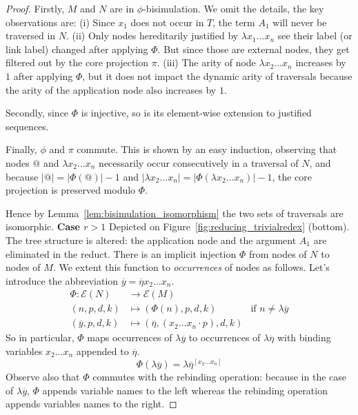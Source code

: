 \documentclass{elsarticle}
\theoremstyle{plain}
\theoremstyle{definition}
\def\coresymbol{\pi} %
\def\nameencoding{\mathcal{E}} %
\begin{document}
\begin{proof}
    Firstly, $M$ and $N$ are in $\phi$-bisimulation. We omit the details, the key observations are:
    (i) Since $x_1$ does not occur in $T$, the term $A_1$ will never be traversed in $N$.
    (ii) Only nodes hereditarily justified by $\lambda x_1 \ldots x_n$ see their label (or link label) changed after applying $\Phi$. But since those are external nodes, they get filtered out by the core projection $\coresymbol$.
    (iii) The arity of node $\lambda x_2 \ldots x_n$ increases by $1$ after applying $\Phi$, but it does not impact the dynamic arity of traversals because the arity of the application node also increases by $1$.

    Secondly, since $\Phi$ is injective, so is its element-wise extension to justified sequences.

    Finally, $\phi$ and $\coresymbol$ commute. This is shown by an easy induction, observing that nodes $@$ and $\lambda x_2\ldots x_n$ necessarily occur consecutively in a traversal of $N$, and because $|@| = |\Phi(@)| -1$ and $|\lambda x_2\ldots x_n| = |\Phi(\lambda x_2\ldots x_n)| - 1$, the core projection is preserved modulo $\Phi$.

    Hence by Lemma~\ref{lem:bisimulation_isomorphism} the two sets of traversals are isomorphic.
{\bf Case $r>1$} Depicted on Figure~\ref{fig:reducing_trivialredex} (bottom). The tree structure is altered: the application node and the argument $A_1$ are eliminated in the reduct. There is an implicit injection $\Phi$ from nodes of $N$ to nodes of $M$. We extent this function to \emph{occurrences} of nodes as follows. Let's introduce the abbreviation $\overline{y} = \overline\eta x_2 \ldots x_n$.
    \begin{align*}
        \Phi\colon \nameencoding(N) &\rightarrow \nameencoding(M) \\
        (n,p,d,k) &\longmapsto (\Phi(n),p,d,k) & \mbox{if $n\neq\lambda\overline{y}$} \\
        (\overline{y},p,d,k) &\longmapsto (\overline\eta,(x_2 \ldots x_n \cdot p),d,k)
    \end{align*}
    So in particular, $\Phi$ maps occurrences of $\lambda\overline{y}$ to occurrences of $\lambda\overline\eta$ with binding variables $x_2 \ldots x_n$ appended to $\overline\eta$.
    \begin{equation}
        \Phi(\lambda\overline{y})
        =
        \lambda\overline\eta^{[x_2\ldots x_n]}
        \label{eqn:phi_maps_lambday_to_lambdaeta}
    \end{equation}
    Observe also that $\Phi$ commutes with the rebinding operation: because in the case of $\lambda\overline{y}$, $\Phi$ appends variable names to the left whereas the rebinding operation appends variables names to the right.


\end{proof}
\end{document}
